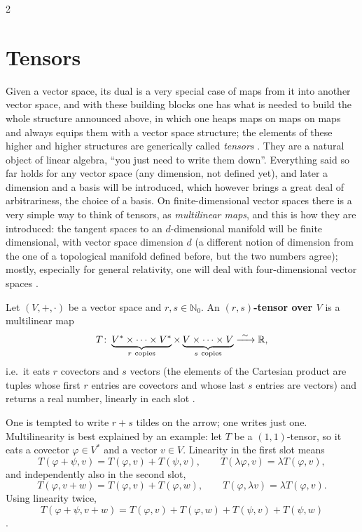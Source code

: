 \begin{paracol}{2}
\section{Tensors}\label{sec:c03-tensors}

Given a vector space, its dual is a very special case of maps from it into another vector space, and with these building blocks one has what is needed to build the whole structure announced above, in which one heaps maps on maps on maps and always
equips them with a vector space structure; the elements of these higher and higher structures are generically called \emph{tensors} . They are a natural object of linear algebra, ``you just need to write them down''.
Everything said so far holds for any vector space (any dimension, not defined yet), and later a dimension and a basis will be introduced, which however brings a great deal of arbitrariness, the choice of a basis. On finite-dimensional vector spaces there is a very
simple way to think of tensors, as \emph{multilinear maps}, and this is how they are introduced: the tangent spaces to an $d$-dimensional manifold will be finite dimensional, with vector space dimension $d$ (a different notion of dimension from the one of a topological manifold defined before, but
the two numbers agree); mostly, especially for general relativity, one will deal with four-dimensional vector spaces .

\begin{definition}\label{def:c03-tensor}
Let $(V,+,\cdot)$ be a vector space and $r,s\in\mathbb N_0$. An \textbf{$(r,s)$-tensor over $V$} is a multilinear map
\[
  T\colon\underbrace{V^*\times\dots\times V^*}_{r\ \text{copies}}\times\underbrace{V\times\dots\times V}_{s\ \text{copies}}\xrightarrow{\ \sim\ }\R,
\]
i.e.\ it eats $r$ covectors and $s$ vectors (the elements of the Cartesian product are tuples whose first $r$ entries are covectors and whose last $s$ entries are vectors) and returns a real number, linearly in each slot
.
\end{definition}
One is tempted to write $r+s$ tildes on the arrow; one writes just one. Multilinearity is best explained by an example: let $T$ be a $(1,1)$-tensor, so it eats a covector $\varphi\in V^*$ and a vector $v\in V$. Linearity in the first slot means
\[
  T(\varphi+\psi,v)=T(\varphi,v)+T(\psi,v),\qquad T(\lambda\varphi,v)=\lambda T(\varphi,v),
\]
and independently also in the second slot,
\[
  T(\varphi,v+w)=T(\varphi,v)+T(\varphi,w),\qquad T(\varphi,\lambda v)=\lambda T(\varphi,v).
\]
Using linearity twice,
\[
  T(\varphi+\psi,v+w)=T(\varphi,v)+T(\varphi,w)+T(\psi,v)+T(\psi,w)
\]
.


\end{paracol}
